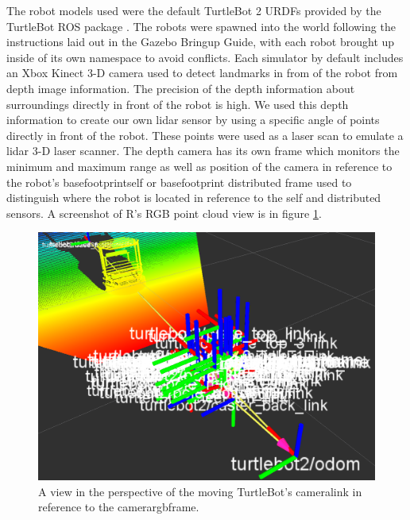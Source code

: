 \documentclass[conference]{IEEEtran} \usepackage[T1]{fontenc} \usepackage[backend=biber, style=ieee]{biblatex}
\begin{document}
The robot models used were the default TurtleBot 2 URDFs provided by the TurtleBot ROS package \cite{turtlebot}. The
robots were spawned into the world following the instructions laid out in the Gazebo Bringup Guide, with each robot
brought up inside of its own namespace to avoid conflicts. Each simulator by default includes an Xbox Kinect 3-D
camera used to detect landmarks in from of the robot from depth image information. The precision of the depth information
about surroundings directly in front of the robot is high. We used this depth information to create our own lidar 
sensor by using a specific angle of points directly in front of the robot. These points were used as a laser scan to emulate
a lidar 3-D laser scanner. The depth camera has its own frame which monitors the minimum and maximum range as well as position
of the camera in reference to the robot's base\textunderscore footprint\textunderscore self or base\textunderscore footprint\textunderscore
distributed frame used to distinguish where the
robot is located in reference to the self and distributed sensors. A screenshot of R's RGB point cloud view is in figure \ref{pic2}.

\begin{figure}
\label{pic2} 
\centering 
\includegraphics[scale=.23]{t2_camera_link}
\caption{A view in the perspective of the moving TurtleBot's camera\textunderscore link in reference to the camera\textunderscore rgb\textunderscore frame.}
\end{figure}
\end{document}
